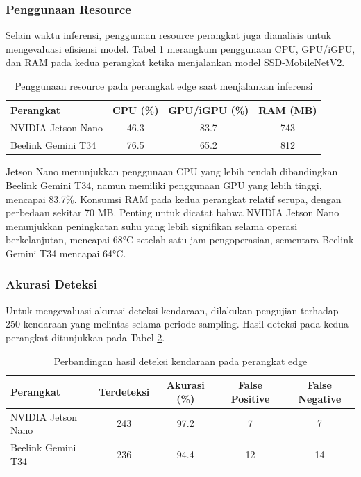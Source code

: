 \subsubsection{Penggunaan Resource}

Selain waktu inferensi, penggunaan resource perangkat juga dianalisis untuk mengevaluasi efisiensi model. Tabel \ref{tab:resource_usage} merangkum penggunaan CPU, GPU/iGPU, dan RAM pada kedua perangkat ketika menjalankan model SSD-MobileNetV2.

\begin{table}[htbp]
  \centering
  \begin{tabular}{|l|c|c|c|}
  \hline
  \rowcolor[HTML]{C0C0C0}
  \textbf{Perangkat} & \textbf{CPU (\%)} & \textbf{GPU/iGPU (\%)} & \textbf{RAM (MB)} \\
  \hline
  NVIDIA Jetson Nano & 46.3 & 83.7 & 743 \\
  \hline
  Beelink Gemini T34 & 76.5 & 65.2 & 812 \\
  \hline
  \end{tabular}
  \caption{Penggunaan resource pada perangkat edge saat menjalankan inferensi}
  \label{tab:resource_usage}
\end{table}

Jetson Nano menunjukkan penggunaan CPU yang lebih rendah dibandingkan Beelink Gemini T34, namun memiliki penggunaan GPU yang lebih tinggi, mencapai 83.7\%. Konsumsi RAM pada kedua perangkat relatif serupa, dengan perbedaan sekitar 70 MB. Penting untuk dicatat bahwa NVIDIA Jetson Nano menunjukkan peningkatan suhu yang lebih signifikan selama operasi berkelanjutan, mencapai 68°C setelah satu jam pengoperasian, sementara Beelink Gemini T34 mencapai 64°C.

\subsubsection{Akurasi Deteksi}

Untuk mengevaluasi akurasi deteksi kendaraan, dilakukan pengujian terhadap 250 kendaraan yang melintas selama periode sampling. Hasil deteksi pada kedua perangkat ditunjukkan pada Tabel \ref{tab:detection_results}.

\begin{table}[htbp]
  \centering
  \begin{tabular}{|l|c|c|c|c|}
  \hline
  \rowcolor[HTML]{C0C0C0}
  \textbf{Perangkat} & \textbf{Terdeteksi} & \textbf{Akurasi (\%)} & \textbf{False Positive} & \textbf{False Negative} \\
  \hline
  NVIDIA Jetson Nano & 243 & 97.2 & 7 & 7 \\
  \hline
  Beelink Gemini T34 & 236 & 94.4 & 12 & 14 \\
  \hline
  \end{tabular}
  \caption{Perbandingan hasil deteksi kendaraan pada perangkat edge}
  \label{tab:detection_results}
\end{table}

